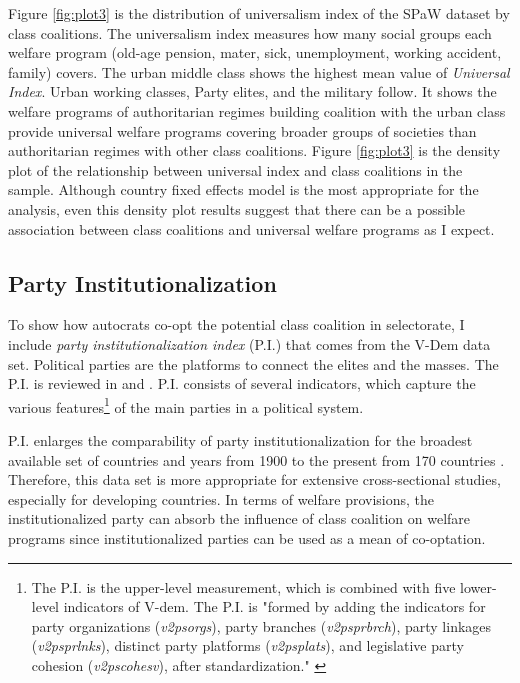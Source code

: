 \documentclass[12pt, letterpage, notitlepage]{article}
\begin{document}
Figure \ref{fig:plot3} is the distribution of universalism index of the SPaW dataset by class coalitions. The universalism index measures how many social groups each welfare program (old-age pension, mater, sick, unemployment, working accident, family) covers. The urban middle class shows the highest mean value of \textit{Universal Index}. Urban working classes, Party elites, and the military follow. It shows the welfare programs of authoritarian regimes building coalition with the urban class provide universal welfare programs covering broader groups of societies than authoritarian regimes with other class coalitions. Figure \ref{fig:plot3} is the density plot of the relationship between universal index and class coalitions in the sample. Although country fixed effects model is the most appropriate for the analysis, even this density plot results suggest that there can be a possible association between class coalitions and universal welfare programs as I expect.


\subsection{Party Institutionalization}

To show how autocrats co-opt the potential class coalition in selectorate, I include \textit{party institutionalization index} (P.I.) that comes from the V-Dem data set. Political parties are the platforms to connect the elites and the masses. The P.I. is reviewed in \citet{Bizzarro2018} and \citet{Rasmussen2019}. P.I. consists of several indicators, which capture the various features\footnote{The P.I. is the upper-level measurement, which is combined with five lower-level indicators of V-dem. The P.I. is "formed by adding the indicators for party organizations (\textit{v2psorgs}), party branches (\textit{v2psprbrch}), party linkages (\textit{v2psprlnks}), distinct party platforms (\textit{v2psplats}), and legislative party cohesion (\textit{v2pscohesv}), after standardization." \citep[2]{Bizzarro2017}} of the main parties in a political system.\par

P.I. enlarges the comparability of party institutionalization for the broadest available set of countries and years from 1900 to the present from 170 countries \citep[9]{Rasmussen2019}. Therefore, this data set is more appropriate for extensive cross-sectional studies, especially for developing countries. In terms of welfare provisions, the institutionalized party can absorb the influence of class coalition on welfare programs since institutionalized parties can be used as a mean of co-optation.\par
\end{document}
